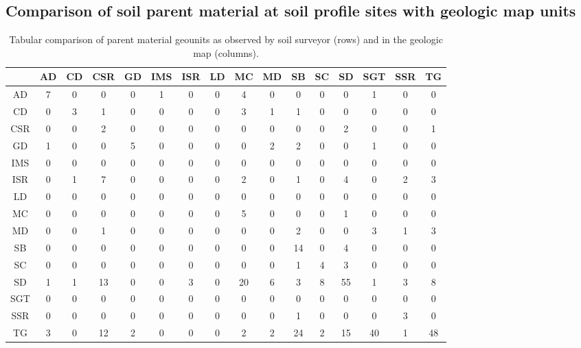 \documentclass[preprint,12pt,authoryear]{elsarticle}
\begin{document}
\subsection{Comparison of soil parent material at soil profile sites with geologic map units}
\begin{table}[ht]
\centering
\tabcolsep=0.10cm
\begin{tabular}{cccccccccccccccc}
  \hline
 & AD & CD & CSR & GD & IMS & ISR & LD & MC & MD & SB & SC & SD & SGT & SSR & TG \\ 
  \hline
AD &   7 &   0 &   0 &   0 &   1 &   0 &   0 &   4 &   0 &   0 &   0 &   0 &   1 &   0 &   0 \\ 
  CD &   0 &   3 &   1 &   0 &   0 &   0 &   0 &   3 &   1 &   1 &   0 &   0 &   0 &   0 &   0 \\ 
  CSR &   0 &   0 &   2 &   0 &   0 &   0 &   0 &   0 &   0 &   0 &   0 &   2 &   0 &   0 &   1 \\ 
  GD &   1 &   0 &   0 &   5 &   0 &   0 &   0 &   0 &   2 &   2 &   0 &   0 &   1 &   0 &   0 \\ 
  IMS &   0 &   0 &   0 &   0 &   0 &   0 &   0 &   0 &   0 &   0 &   0 &   0 &   0 &   0 &   0 \\ 
  ISR &   0 &   1 &   7 &   0 &   0 &   0 &   0 &   2 &   0 &   1 &   0 &   4 &   0 &   2 &   3 \\ 
  LD &   0 &   0 &   0 &   0 &   0 &   0 &   0 &   0 &   0 &   0 &   0 &   0 &   0 &   0 &   0 \\ 
  MC &   0 &   0 &   0 &   0 &   0 &   0 &   0 &   5 &   0 &   0 &   0 &   1 &   0 &   0 &   0 \\ 
  MD &   0 &   0 &   1 &   0 &   0 &   0 &   0 &   0 &   0 &   2 &   0 &   0 &   3 &   1 &   3 \\ 
  SB &   0 &   0 &   0 &   0 &   0 &   0 &   0 &   0 &   0 &  14 &   0 &   4 &   0 &   0 &   0 \\ 
  SC &   0 &   0 &   0 &   0 &   0 &   0 &   0 &   0 &   0 &   1 &   4 &   3 &   0 &   0 &   0 \\ 
  SD &   1 &   1 &  13 &   0 &   0 &   3 &   0 &  20 &   6 &   3 &   8 &  55 &   1 &   3 &   8 \\ 
  SGT &   0 &   0 &   0 &   0 &   0 &   0 &   0 &   0 &   0 &   0 &   0 &   0 &   0 &   0 &   0 \\ 
  SSR &   0 &   0 &   0 &   0 &   0 &   0 &   0 &   0 &   0 &   1 &   0 &   0 &   0 &   3 &   0 \\ 
  TG &   3 &   0 &  12 &   2 &   0 &   0 &   0 &   2 &   2 &  24 &   2 &  15 &  40 &   1 &  48 \\ 
   \hline
\end{tabular}
\caption{Tabular comparison of parent material geounits as observed by soil surveyor (rows) and in the geologic map (columns).} 
\label{kartiergegenkarte}
\end{table}
\end{document}
